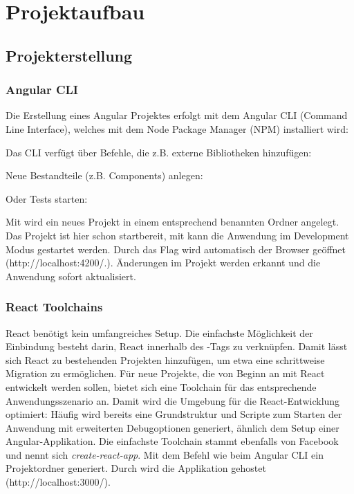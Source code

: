\section{Projektaufbau}
\subsection{Projekterstellung}
\subsubsection{Angular CLI}
Die Erstellung eines Angular Projektes erfolgt mit dem Angular CLI (Command Line Interface), welches mit dem Node Package Manager (NPM) installiert wird: 


Das CLI verfügt über Befehle, die z.B. externe Bibliotheken hinzufügen:


Neue Bestandteile (z.B. Components) anlegen:


Oder Tests starten:


Mit  wird ein neues Projekt in einem entsprechend benannten Ordner angelegt. Das Projekt ist hier schon startbereit, mit  kann die Anwendung im Development Modus gestartet werden. Durch das Flag wird automatisch der Browser geöffnet (http://localhost:4200/.). Änderungen im Projekt werden erkannt und die Anwendung sofort aktualisiert.\cite{CLI}

\subsubsection{React Toolchains}
React benötigt kein umfangreiches Setup. Die einfachste Möglichkeit der Einbindung besteht darin, React innerhalb des -Tags zu verknüpfen. Damit lässt sich React zu bestehenden Projekten hinzufügen, um etwa eine schrittweise Migration zu ermöglichen. Für neue Projekte, die von Beginn an mit React entwickelt werden sollen, bietet sich eine Toolchain für das entsprechende Anwendungsszenario an. Damit wird die Umgebung für die React-Entwicklung optimiert: Häufig wird bereits eine Grundstruktur und Scripte zum Starten der Anwendung mit erweiterten Debugoptionen generiert, ähnlich dem Setup einer Angular-Applikation. Die einfachste Toolchain stammt ebenfalls von Facebook und nennt sich \textit{create-react-app}. Mit dem Befehl  wie beim Angular CLI ein Projektordner generiert. Durch  wird die Applikation gehostet (http://localhost:3000/).\cite{CreateReactApp}


